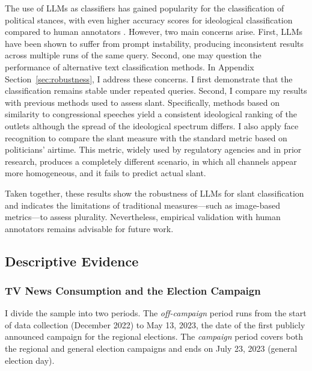 \documentclass[12pt]{article}
\begin{document}
	The use of LLMs as classifiers has gained popularity for the classification of political stances, with even higher accuracy scores for ideological classification compared to human annotators \citep[see, e.g.,][]{lemens,tornberg2023,Gilardi2023ChatGPTOC}. However, two main concerns arise. First, LLMs have been shown to suffer from prompt instability, producing inconsistent results across multiple runs of the same query. Second, one may question the performance of alternative text classification methods. In Appendix Section~\ref{sec:robustness}, I address these concerns. I first demonstrate that the classification remains stable under repeated queries. Second, I compare my results with previous methods used to assess slant. Specifically, methods based on similarity to congressional speeches \citep{gentzkow2010media,laver2003extracting} yield a consistent ideological ranking of the outlets although the spread of the ideological spectrum differs. I also apply face recognition to compare the slant measure with the standard metric based on politicians’ airtime. This metric, widely used by regulatory agencies and in prior research, produces a completely different scenario, in which all channels appear more homogeneous, and it fails to predict actual slant.
	
	Taken together, these results show the robustness of LLMs for slant classification and indicates the limitations of traditional measures—such as image-based metrics—to assess plurality. Nevertheless, empirical validation with human annotators remains advisable for future work.
	
	
	
	
	\subsection{Descriptive Evidence}
	
	
	\subsubsection*{TV News Consumption and the Election Campaign}
	
	
	
	
	I divide the sample into two periods. The \textit{off-campaign} period runs from the start of data collection (December 2022) to May 13, 2023, the date of the first publicly announced campaign for the regional elections. The \textit{campaign} period covers both the regional and general election campaigns and ends on July 23, 2023 (general election day). 
	
\end{document}
